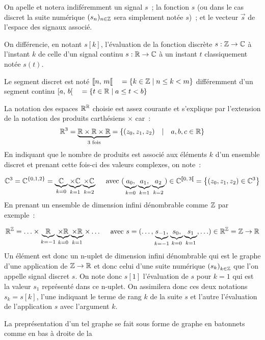 \begin{remarque}
  On apelle et notera indiféremment un signal $s$~; la fonction
  $s$ (ou dans le cas discret la suite numérique $(s_n)_{n\in\mathbb{Z}}$ sera
  simplement notée $s$)~; et le vecteur $\vec{s}$ de l'espace des
  signaux associé.

  On différencie, en notant $s[k]$, l'évaluation de la fonction
  discrète $s: \mathbb{Z}\to\mathbb{C}$ à l'instant $k$ de celle d'un signal continu
  $s: \mathbb{R}\to\mathbb{C}$ à un instant $t$ classiquement notée $s(t)$.
  
  Le segment discret est noté
  ${[\![ n,\,m[\![} \quad =\left\{k \in\mathbb{Z} \;|\; n\leq k < m\right\}$
  différemment d'un segment continu
  ${\left[ a,\,b \right[} \quad =\left\{t\in\mathbb{R} \;|\; a\leq t < b\right\}$

  La notation des espaces $\mathbb{R}^{\mathbb{R}}$ choisie est assez courante et
  s'explique par l'extension de la notation des produits carthésiens
  $\times$ car~:
  $$ \mathbb{R}^3 = \underbrace{\mathbb{R}\times\mathbb{R}\times\mathbb{R}}_{\text{3 fois}} = \left\{ (z_0, z_1, z_2) \quad|\quad a,b,c \in \mathbb{R} \right\}$$
  En indiquant que le nombre de produits est associé aux éléments $k$
  d'un ensemble discret et prenant cette fois-ci des valeurs
  complexes, on note~:
  
  $$ \mathbb{C}^3 = \mathbb{C}^{\left\{0, 1, 2\right\}} = \underbrace{\mathbb{C}}_{k=0}\underbrace{\times\mathbb{C}}_{k=1}\underbrace{\times\mathbb{C}}_{k=2} \quad\text{ avec } (\underbrace{a_0, }_{k=0}\underbrace{a_1, }_{k=1}\underbrace{a_2}_{k=2}) \in  \mathbb{C}^{{[\![ 0,\,3[\![}} = \left\{ (z_0, z_1, z_2) \in \mathbb{C}^3 \right\}$$
  En prenant un ensemble de dimension infini dénombrable comme $\mathbb{Z}$
  par exemple~:

  $$ \mathbb{R}^{\mathbb{Z}} = \ldots \times \underbrace{\mathbb{R}}_{k=-1} \underbrace{\times\mathbb{R}}_{k=0} \underbrace{\times\mathbb{R}}_{k=1} \times \ldots \quad\text{ avec } s=(\ldots, \underbrace{s_{-1}, }_{k=-1}\underbrace{s_0, }_{k=0}\underbrace{s_1}_{k=1}, \ldots) \in  \mathbb{R}^{\mathbb{Z}}= \mathbb{Z}\to\mathbb{R}$$
  Un élément est donc un n-uplet de dimension infini dénombrable qui
  est le graphe d'une application de $\mathbb{Z}\to\mathbb{R}$ et donc celui d'une
  suite numérique $\left(s_k\right)_{k\in\mathbb{Z}}$ que l'on appelle signal
  discret $s$. On note donc $s[1]$ l'évaluation de $s$ pour $k=1$ qui
  est la valeur $s_1$ représenté dans ce n-uplet. On assimilera donc
  ces deux notations $s_k=s[k]$, l'une indiquant le terme de rang $k$
  de la suite $s$ et l'autre l'évaluation de l'application $s$ avec
  l'argument $k$.

  La preprésentation d'un tel graphe se fait sous forme de graphe en
  \og{} batonnets\fg{} comme en bas à droite de la


\end{remarque}
